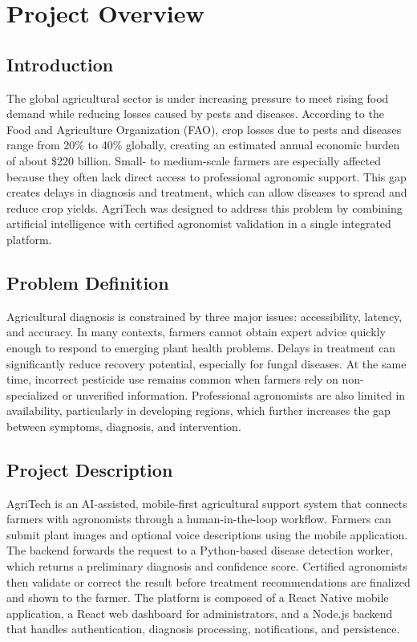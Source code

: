\documentclass[12pt]{article}
\begin{document}

\tableofcontents
\newpage
\listoffigures
\newpage
\listoftables
\newpage

\section{Project Overview}

\subsection{Introduction}
The global agricultural sector is under increasing pressure to meet rising food demand while reducing losses caused by pests and diseases. According to the Food and Agriculture Organization (FAO), crop losses due to pests and diseases range from 20\% to 40\% globally, creating an estimated annual economic burden of about \$220 billion. Small- to medium-scale farmers are especially affected because they often lack direct access to professional agronomic support. This gap creates delays in diagnosis and treatment, which can allow diseases to spread and reduce crop yields. AgriTech was designed to address this problem by combining artificial intelligence with certified agronomist validation in a single integrated platform.

\subsection{Problem Definition}
Agricultural diagnosis is constrained by three major issues: accessibility, latency, and accuracy. In many contexts, farmers cannot obtain expert advice quickly enough to respond to emerging plant health problems. Delays in treatment can significantly reduce recovery potential, especially for fungal diseases. At the same time, incorrect pesticide use remains common when farmers rely on non-specialized or unverified information. Professional agronomists are also limited in availability, particularly in developing regions, which further increases the gap between symptoms, diagnosis, and intervention.

\subsection{Project Description}
AgriTech is an AI-assisted, mobile-first agricultural support system that connects farmers with agronomists through a human-in-the-loop workflow. Farmers can submit plant images and optional voice descriptions using the mobile application. The backend forwards the request to a Python-based disease detection worker, which returns a preliminary diagnosis and confidence score. Certified agronomists then validate or correct the result before treatment recommendations are finalized and shown to the farmer. The platform is composed of a React Native mobile application, a React web dashboard for administrators, and a Node.js backend that handles authentication, diagnosis processing, notifications, and persistence.
\end{document}
